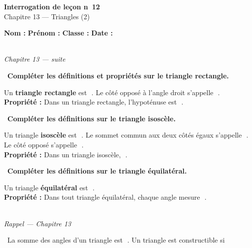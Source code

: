 \documentclass[a4paper,11pt]{article}
\newcommand{\bl}[1][4cm]{\,\makebox[#1]{\dotfill}\,}
\newcommand{\coeur}{\textcolor{Couleur8}{\faHeart}\ }
\newcommand{\coeurrappel}{\textcolor{Couleur6}{\faHeart}\ }
\begin{document}
\begin{mdframed}[linecolor=Couleur1,linewidth=2pt,topline=true,bottomline=true,leftline=false,rightline=false,innertopmargin=8pt,innerbottommargin=8pt,backgroundcolor=Couleur1!5]
\begin{center}
{\Large\bfseries\textcolor{Couleur1}{Interrogation de le\c{c}on n\degre~12}}\\[4pt]
{\large\textcolor{Couleur8}{Chapitre 13 --- Triangles (2)}}
\end{center}
\end{mdframed}
\vspace{0.4cm}
\noindent\textbf{Nom :} \dotfill\quad\textbf{Pr\'enom :} \dotfill\quad\textbf{Classe :} \dotfill\quad\textbf{Date :} \dotfill
\vspace{0.5cm}

\vspace{0.3cm}
\noindent{\textcolor{Couleur8}{\rule{\textwidth}{0.5pt}}}\\
{\small\textit{\textcolor{Couleur8}{Chapitre 13 --- suite}}}
\vspace{0.1cm}

\noindent \coeur \textbf{Compl\'eter les d\'efinitions et propri\'et\'es sur le triangle rectangle.}
\begin{mdframed}[linecolor=Couleur6,linewidth=4pt,topline=false,bottomline=false,rightline=false,backgroundcolor=Couleur6!10,innerleftmargin=8pt,innertopmargin=6pt,innerbottommargin=6pt]
Un \textbf{triangle rectangle} est \bl[6cm]. Le c\^ot\'e oppos\'e \`a l'angle droit s'appelle \bl[4cm].\\[4pt]
\textbf{Propri\'et\'e :} Dans un triangle rectangle, l'hypot\'enuse est \bl[5cm].
\end{mdframed}

\noindent \coeur \textbf{Compl\'eter les d\'efinitions sur le triangle isosc\`ele.}
\begin{mdframed}[linecolor=Couleur6,linewidth=4pt,topline=false,bottomline=false,rightline=false,backgroundcolor=Couleur6!10,innerleftmargin=8pt,innertopmargin=6pt,innerbottommargin=6pt]
Un triangle \textbf{isosc\`ele} est \bl[6cm]. Le sommet commun aux deux c\^ot\'es \'egaux s'appelle \bl[4cm]. Le c\^ot\'e oppos\'e s'appelle \bl[3cm].\\[4pt]
\textbf{Propri\'et\'e :} Dans un triangle isosc\`ele, \bl[6cm].
\end{mdframed}

\noindent \coeur \textbf{Compl\'eter les d\'efinitions sur le triangle \'equilat\'eral.}
\begin{mdframed}[linecolor=Couleur6,linewidth=4pt,topline=false,bottomline=false,rightline=false,backgroundcolor=Couleur6!10,innerleftmargin=8pt,innertopmargin=6pt,innerbottommargin=6pt]
Un triangle \textbf{\'equilat\'eral} est \bl[7cm].\\[4pt]
\textbf{Propri\'et\'e :} Dans tout triangle \'equilat\'eral, chaque angle mesure \bl[2cm].
\end{mdframed}

\vspace{0.3cm}
\noindent{\textcolor{Couleur8}{\rule{\textwidth}{0.5pt}}}\\
{\small\textit{\textcolor{Couleur8}{Rappel --- Chapitre 13}}}
\vspace{0.1cm}

\noindent \coeurrappel La somme des angles d'un triangle est \bl[2cm]. Un triangle est constructible si \dotfill
\end{document}
